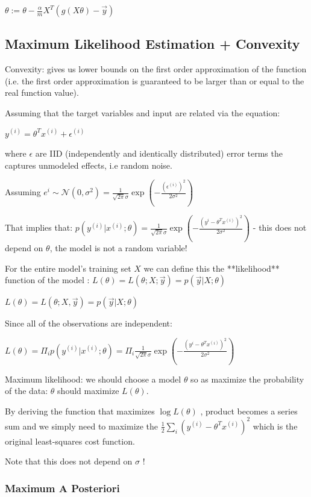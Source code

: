 $\theta:=\theta - \frac{\alpha}{m}X^T(g(X\theta)-\vec{y})$

\subsection{ Maximum Likelihood Estimation + Convexity}

Convexity: gives us lower bounds on the first order approximation of the function (i.e. the first order approximation is guaranteed to be larger than or equal to the real function value).

Assuming that the target variables and input are related via the equation: 

$y^{(i)}=\theta^Tx^{(i)}+\epsilon^{(i)}$

where $\epsilon$ are IID (independently and identically distributed) error terms the captures unmodeled effects, i.e random noise.

Assuming $e^{i}\sim\mathcal{N}(0,\sigma^2)=\frac{1}{\sqrt{2\pi}\sigma}\exp\left(-\frac{(\epsilon^{(i)})^2}{2\sigma^2}\right)$

That implies that: $p(y^{(i)}|x^{(i)};\theta)=\frac{1}{\sqrt{2\pi}\sigma}\exp\left(-\frac{(y^{i}- \theta^Tx^{(i)})^2}{2\sigma^2}\right)$ - this does not depend on $\theta$, the model is not a random variable! 

For the entire model's training set $X$  we can define this the **likelihood** function of the model : $L(\theta)=L(\theta;X;\vec{y})=p(\vec{y}|X;\theta)$

$L(\theta) = L(\theta;X,\vec y) = p(\vec y| X;\theta)$

Since all of the observations are independent:

$L(\theta)= \Pi_{i} p(y^{(i)}| x^{(i)};\theta) = \Pi_{i} \frac{1}{\sqrt{2\pi}\sigma}\exp\left(-\frac{(y^{i}- \theta^Tx^{(i)})^2}{2\sigma^2}\right) $

Maximum likelihood: we should choose a model $\theta$ so as maximize the probability of the data: $\theta$ should maximize $L(\theta)$. 

By deriving the function that maximizes $\log L(\theta)$ , product becomes a series sum and we simply need to maximize the $\frac 1 2 \sum_i (y^{(i)}-\theta^T x^{(i)})^2$ which is the original least-squares cost function.

Note that this does not depend on $\sigma$ !

\subsubsection{Maximum A Posteriori}

